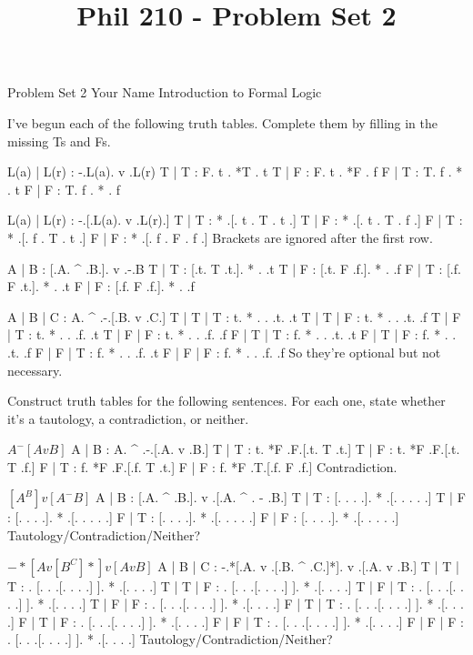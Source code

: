 
\title{Phil 210 - Problem Set 2}

\heading
Problem Set 2
Your Name
Introduction to Formal Logic
\endheading

I've begun each of the following truth tables. Complete them by filling in the missing Ts and Fs.

\problems
{}
\truthtable
 L(a) | L(r) : -.L(a).  v  .L(r)
\truthtableline
  T   |  T   : F. t  . *T  . t
  T   |  F   : F. t  . *F  . f
  F   |  T   : T. f  . *   . t
  F   |  F   : T. f  . *   . f
\endtruthtable

\truthtable
 L(a) | L(r) :  -.[.L(a). v .L(r).]
\truthtableline
  T   |  T   : * .[. t  . T . t  .]
  T   |  F   : * .[. t  . T . f  .]
  F   |  T   : * .[. f  . T . t  .]
  F   |  F   : * .[. f  . F . f  .]
\endtruthtable
\Hint Brackets are ignored after the first row.

\truthtable
 A | B : [.A. ^ .B.].  v  .-.B
\truthtableline
 T | T : [.t. T .t.]. *   . .t
 T | F : [.t. F .f.]. *   . .f
 F | T : [.f. F .t.]. *   . .t
 F | F : [.f. F .f.]. *   . .f
\endtruthtable

\truthtable
 A | B | C : A.  ^  .-.[.B. v .C.]
\truthtableline
 T | T | T : t. *   . . .t.   .t
 T | T | F : t. *   . . .t.   .f
 T | F | T : t. *   . . .f.   .t
 T | F | F : t. *   . . .f.   .f
 F | T | T : f. *   . . .t.   .t
 F | T | F : f. *   . . .t.   .f
 F | F | T : f. *   . . .f.   .t
 F | F | F : f. *   . . .f.   .f
\endtruthtable
\Hint So they're optional but not necessary.

\endproblems
\pagebreak

Construct truth tables for the following sentences. For each one, state whether it's a tautology, a contradiction, or neither.

\problems
{}
$ A ^ -[A v B] $
	\answer
	\truthtable
	 A | B : A.  ^  .-.[.A. v .B.]
	\truthtableline
	 T | T : t. *F  .F.[.t. T .t.]
	 T | F : t. *F  .F.[.t. T .f.]
	 F | T : f. *F  .F.[.f. T .t.]
	 F | F : f. *F  .T.[.f. F .f.]
	\endtruthtable
	Contradiction.
	\endanswer

$ [A ^ B] v [A ^ -B] $
	\answer
	\truthtable
	 A | B : [.A. ^ .B.].  v  .[.A. ^ . - .B.]
	\truthtableline
	 T | T : [. .   . .]. *   .[. .   .   . .]
	 T | F : [. .   . .]. *   .[. .   .   . .]
	 F | T : [. .   . .]. *   .[. .   .   . .]
	 F | F : [. .   . .]. *   .[. .   .   . .]
	\endtruthtable
	Tautology/Contradiction/Neither?
	\endanswer

$ -*[A v [B ^ C]*] v [A v B] $
	\answer
	\truthtable
	 A | B | C : -.*[.A. v .[.B. ^ .C.]*].  v  .[.A. v .B.]
	\truthtableline
	 T | T | T :  . [. .   .[. .   . .] ]. *   .[. .   . .]
	 T | T | F :  . [. .   .[. .   . .] ]. *   .[. .   . .]
	 T | F | T :  . [. .   .[. .   . .] ]. *   .[. .   . .]
	 T | F | F :  . [. .   .[. .   . .] ]. *   .[. .   . .]
	 F | T | T :  . [. .   .[. .   . .] ]. *   .[. .   . .]
	 F | T | F :  . [. .   .[. .   . .] ]. *   .[. .   . .]
	 F | F | T :  . [. .   .[. .   . .] ]. *   .[. .   . .]
	 F | F | F :  . [. .   .[. .   . .] ]. *   .[. .   . .]
	\endtruthtable
	Tautology/Contradiction/Neither?
	\endanswer

